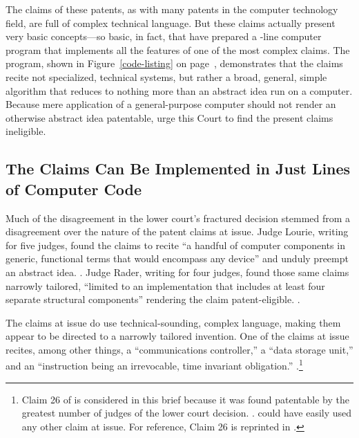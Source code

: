 \documentclass{scotus}
\begin{document}
The claims of these patents, as with many patents in the computer technology
field, are full of complex technical language.
But these claims actually present very basic concepts---so basic, in fact, that
\amici have prepared a \numlines-line computer program
that implements all the features of one of the most complex claims. The program,
shown in Figure~\ref{code-listing} on page~\pageref{code-listing},
demonstrates that the claims recite not specialized, technical systems, but
rather a broad, general, simple algorithm that reduces to nothing more than an
abstract idea run on a computer. Because mere application of a general-purpose
computer should not render an otherwise abstract idea patentable, \amici
urge this Court to find the present claims ineligible.



%
%
\subsection{The Claims Can Be Implemented in Just \Numlines Lines of
Computer Code}

Much of the disagreement in the lower court's fractured decision stemmed
from a disagreement over the nature of the patent claims at issue. Judge Lourie,
writing for five judges,
found the claims to recite ``a handful of
computer components in generic, functional terms that would encompass any
device'' and unduly preempt an abstract idea. .
Judge Rader, writing for four judges, found those same claims narrowly tailored,
``limited to an implementation that includes at least four separate structural
components'' rendering the claim patent-eligible. .

The claims at issue do use technical-sounding, complex language, making them
appear to be directed to a narrowly tailored invention. One of the claims at
issue recites, among other things, a ``communications controller,'' a
``data storage unit,'' and an ``instruction being an irrevocable, time invariant
obligation.'' .\footnote{Claim 26 of
 is considered in this brief because it was found patentable by
the greatest number of judges of the lower court decision. .
\Amici could have easily used any other claim at issue.
For reference, Claim
26 is reprinted in .}
\end{document}
